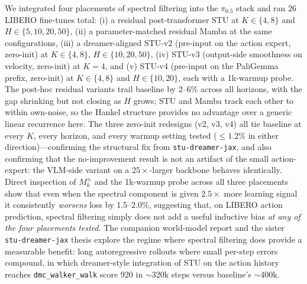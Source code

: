 \documentclass[10pt, letterpaper]{article}
\begin{document}
We integrated four placements of spectral filtering into the $\pi_{0.5}$ stack and ran 26 LIBERO fine-tunes total: (i) a residual post-transformer STU at $K \in \{4,8\}$ and $H \in \{5,10,20,50\}$, (ii) a parameter-matched residual Mamba at the same configurations, (iii) a dreamer-aligned STU-v2 (pre-input on the action expert, zero-init) at $K \in \{4, 8\}$, $H \in \{10, 20, 50\}$, (iv) STU-v3 (output-side smoothness on velocity, zero-init) at $K{=}4$, and (v) STU-v4 (pre-input on the PaliGemma prefix, zero-init) at $K \in \{4, 8\}$ and $H \in \{10, 20\}$, each with a 1k-warmup probe. The post-hoc residual variants trail baseline by 2--6\% across all horizons, with the gap shrinking but not closing as $H$ grows; STU and Mamba track each other to within own-noise, so the Hankel structure provides no advantage over a generic linear recurrence here. The three zero-init redesigns (v2, v3, v4) all tie baseline at every $K$, every horizon, and every warmup setting tested ($\le 1.2\%$ in either direction)---confirming the structural fix from \texttt{stu-dreamer-jax}, and also confirming that the no-improvement result is not an artifact of the small action-expert: the VLM-side variant on a $25\times$-larger backbone behaves identically. Direct inspection of $M_k^\pm$ and the 1k-warmup probe across all three placements show that even when the spectral component is given $2.5\times$ more learning signal it consistently \emph{worsens} loss by 1.5--2.0\%, suggesting that, on LIBERO action prediction, spectral filtering simply does not add a useful inductive bias \emph{at any of the four placements tested}. The companion world-model report and the sister \texttt{stu-dreamer-jax} thesis explore the regime where spectral filtering does provide a measurable benefit: long autoregressive rollouts where small per-step errors compound, in which dreamer-style integration of STU on the action history reaches \texttt{dmc\_walker\_walk} score 920 in $\sim$320k steps versus baseline's $\sim$400k.

\end{document}
